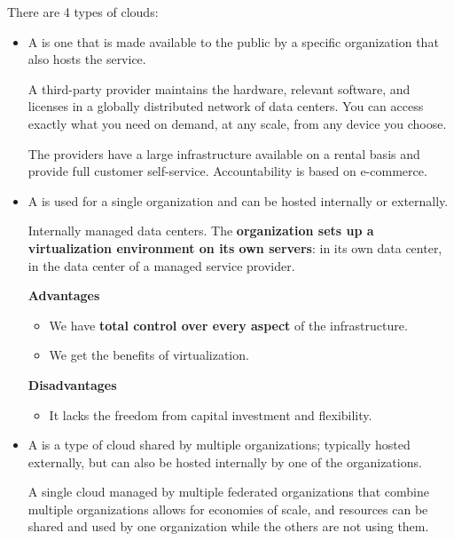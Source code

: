There are 4 types of clouds:
\begin{itemize}
	\item A  is one that is made available to the public by a specific organization that also hosts the service.
	
	A third-party provider maintains the hardware, relevant software, and licenses in a globally distributed network of data centers. You can access exactly what you need on demand, at any scale, from any device you choose.
	
	The providers have a large infrastructure available on a rental basis and provide full customer self-service. Accountability is based on e-commerce.
	
	
	\item A  is used for a single organization and can be hosted internally or externally.
	
	Internally managed data centers. The \textbf{organization sets up a virtualization environment on its own servers}: in its own data center, in the data center of a managed service provider.
	
	\begin{flushleft}
		\textcolor{Green3}{ \textbf{Advantages}}
	\end{flushleft}
	\begin{itemize}
		\item We have \textbf{total control over every aspect} of the infrastructure.
		\item We get the benefits of virtualization.
	\end{itemize}
	\begin{flushleft}
		\textcolor{Red2}{ \textbf{Disadvantages}}
	\end{flushleft}
	\begin{itemize}
		\item It lacks the freedom from capital investment and flexibility.
	\end{itemize}
	
	
	\item A  is a type of cloud shared by multiple organizations; typically hosted externally, but can also be hosted internally by one of the organizations.
	
	A single cloud managed by multiple federated organizations that combine multiple organizations allows for economies of scale, and resources can be shared and used by one organization while the others are not using them.
	

\end{itemize}
